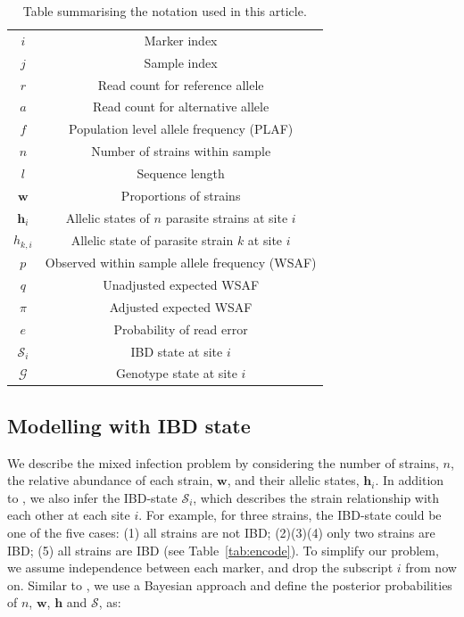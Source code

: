 \documentclass[9pt]{article}
\begin{document}
\begin{table}[htb]\centering
\begin{tabular}{c|c}\hline
$i$              & Marker index\\
$j$              & Sample index \\
$r$              & Read count for reference allele \\
$a$              & Read count for alternative allele \\
$f$              & Population level allele frequency (PLAF) \\
$n$              & Number of strains within sample \\
$l$              & Sequence length \\
$\mathbf{w}$      & Proportions of strains \\
$\mathbf{h}_{i}$ & Allelic states of $n$ parasite strains at site $i$ \\
$h_{k,i}$   & Allelic state of parasite strain $k$ at site $i$\\
$p$              & Observed within sample allele frequency (WSAF) \\
$q$              & Unadjusted expected WSAF  \\
$\pi$            & Adjusted expected WSAF \\
$e$              & Probability of read error\\
$\mathcal{S}_{i}$ & IBD state at site $i$ \\
$\mathcal{G}$ & Genotype state at site $i$ \\
\hline
\end{tabular}
\vspace{.2cm}
\caption{Table summarising the notation used in this article.}\label{tab:notation}
\end{table}

\subsection{Modelling with IBD state}

We describe the mixed infection problem by considering the number of strains, $n$, the relative abundance of each strain, $\mathbf{w}$, and their allelic states, $\mathbf{h}_{i}$. In addition to \citet{Zhu2017}, we also infer the IBD-state $\mathcal{S}_{i}$, which describes the strain relationship with each other at each site $i$. For example, for three strains, the IBD-state could be one of the five cases: (1) all strains are not IBD; (2)(3)(4) only two strains are IBD; (5) all strains are IBD (see Table~\ref{tab:encode}). To simplify our problem, we assume independence between each marker, and drop the subscript $i$ from now on. Similar to \citet{Jack2016}, we use a Bayesian approach and define the posterior probabilities of $n$, $\mathbf{w}$, $\mathbf{h}$ and $\mathcal{S}$,  as:
\end{document}
